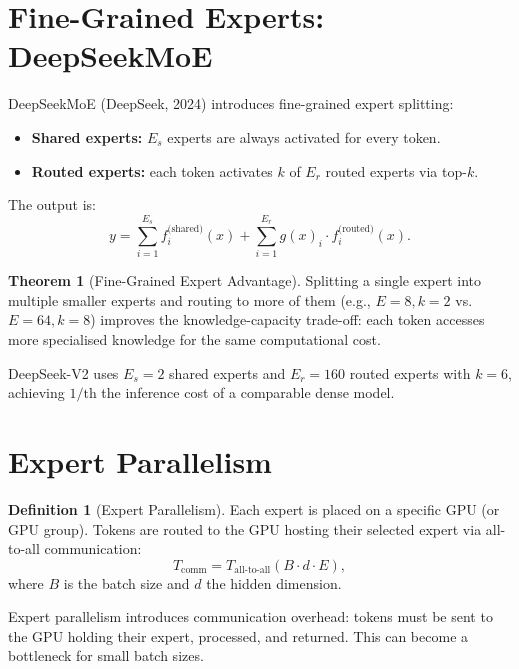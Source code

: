 \documentclass[11pt,a4paper]{book}
\theoremstyle{definition}
\newtheorem{definition}{Definition}[chapter]
\newtheorem{theorem}{Theorem}[chapter]
\begin{document}
\section{Fine-Grained Experts: DeepSeekMoE}

DeepSeekMoE (DeepSeek, 2024) introduces fine-grained expert splitting:

\begin{itemize}
	\item \textbf{Shared experts:} $E_s$ experts are always activated for every token.
	\item \textbf{Routed experts:} each token activates $k$ of $E_r$ routed experts via top-$k$.
\end{itemize}

The output is:
\begin{equation}
	y = \sum_{i=1}^{E_s} f_i^{\text{(shared)}}(x) + \sum_{i=1}^{E_r} g(x)_i \cdot f_i^{\text{(routed)}}(x).
\end{equation}

\begin{theorem}[Fine-Grained Expert Advantage]
	Splitting a single expert into multiple smaller experts and routing to more of them (e.g., $E=8, k=2$ vs. $E=64, k=8$) improves the knowledge-capacity trade-off: each token accesses more specialised knowledge for the same computational cost.
\end{theorem}

DeepSeek-V2 uses $E_s = 2$ shared experts and $E_r = 160$ routed experts with $k = 6$, achieving $1/\text{th}$ the inference cost of a comparable dense model.

\section{Expert Parallelism}

\begin{definition}[Expert Parallelism]
	Each expert is placed on a specific GPU (or GPU group). Tokens are routed to the GPU hosting their selected expert via all-to-all communication:
	\begin{equation}
		T_{\text{comm}} = T_{\text{all-to-all}}(B \cdot d \cdot E),
	\end{equation}
	where $B$ is the batch size and $d$ the hidden dimension.
\end{definition}

Expert parallelism introduces communication overhead: tokens must be sent to the GPU holding their expert, processed, and returned. This can become a bottleneck for small batch sizes.
\end{document}
